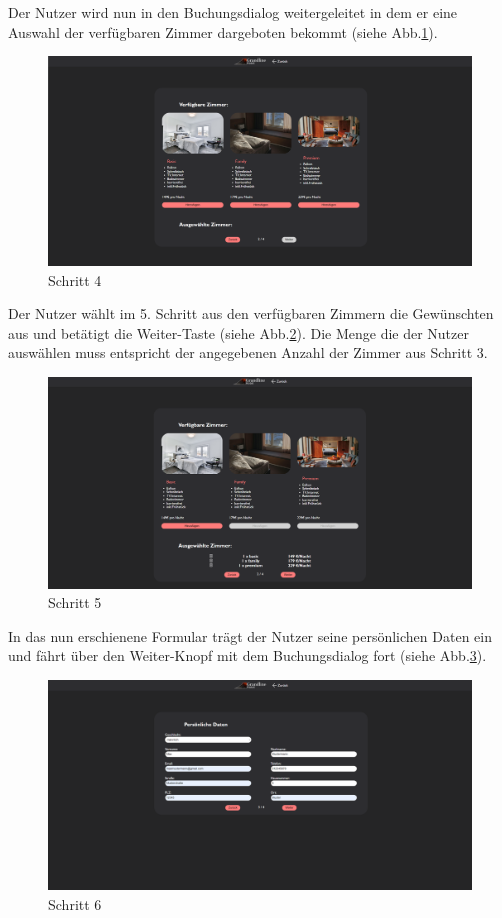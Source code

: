 \newline
Der Nutzer wird nun in den Buchungsdialog weitergeleitet in dem er eine Auswahl der verfügbaren Zimmer dargeboten bekommt (siehe Abb.\ref{step4}).
\begin{figure}
	\includegraphics[width=\textwidth]{images/Beispiel/Schritt4.png}
	\caption{Schritt 4}
	\label{step4}
\end{figure}
\newpage
Der Nutzer wählt im 5. Schritt aus den verfügbaren Zimmern die Gewünschten aus und betätigt die \glqq Weiter\grqq-Taste (siehe Abb.\ref{step5}). Die Menge die der Nutzer auswählen muss entspricht der angegebenen Anzahl der Zimmer aus Schritt 3.
\begin{figure}
	\includegraphics[width=\textwidth]{images/Beispiel/Schritt5.png}
	\caption{Schritt 5}
	\label{step5}
\end{figure}
\newpage
In das nun erschienene Formular trägt der Nutzer seine persönlichen Daten ein und fährt über den \glqq Weiter\grqq-Knopf mit dem Buchungsdialog fort (siehe Abb.\ref{step6}).
\begin{figure}
	\includegraphics[width=\textwidth]{images/Beispiel/Schritt6.png}
	\caption{Schritt 6}
	\label{step6}
\end{figure}
